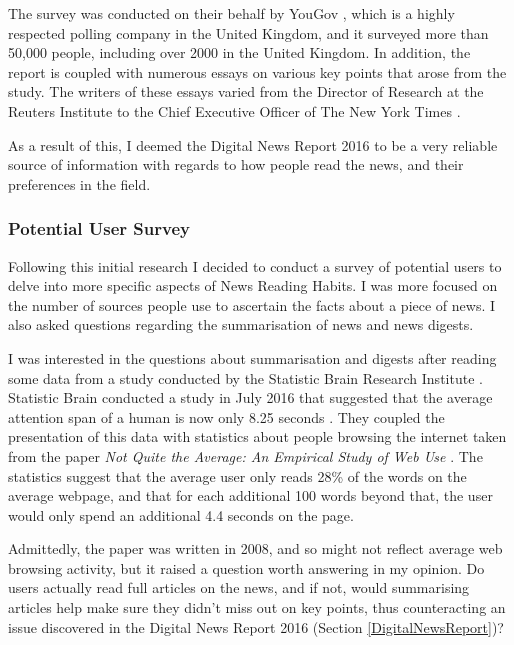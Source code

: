 \documentclass[12pt]{article}
\begin{document}
The survey was conducted on their behalf by YouGov \cite{yougov}, which is a highly respected polling company in the United Kingdom, and it surveyed more than 50,000 people, including over 2000 in the United Kingdom. In addition, the report is coupled with numerous essays on various key points that arose from the study. The writers of these essays varied from the Director of Research at the Reuters Institute to the Chief Executive Officer of The New York Times \cite{newYorkTimes}.

As a result of this, I deemed the Digital News Report 2016 \cite{digitalNewsReport} to be a very reliable source of information with regards to how people read the news, and their preferences in the field. 

\subsubsection{Potential User Survey}

\label{survey}

Following this initial research I decided to conduct a survey of potential users to delve into more specific aspects of News Reading Habits. I was more focused on the number of sources people use to ascertain the facts about a piece of news. I also asked questions regarding the summarisation of news and news digests.

I was interested in the questions about summarisation and digests after reading some data from a study conducted by the Statistic Brain Research Institute \cite{statisticBrain}. Statistic Brain conducted a study in July 2016 that suggested that the average attention span of a human is now only 8.25 seconds \cite{attentionSpan}. They coupled the presentation of this data with statistics about people browsing the internet taken from the paper \emph{Not Quite the Average:
An Empirical Study of Web Use} \cite{empiricalStudyofWebUse}. The statistics suggest that the average user only reads 28\% of the words on the average webpage, and that for each additional 100 words beyond that, the user would only spend an additional 4.4 seconds on the page.

Admittedly, the paper was written in 2008, and so might not reflect average web browsing activity, but it raised a question worth answering in my opinion. Do users actually read full articles on the news, and if not, would summarising articles help make sure they didn't miss out on key points, thus counteracting an issue discovered in the Digital News Report 2016 \cite{digitalNewsReport} (Section \ref{DigitalNewsReport})? 
\end{document}
